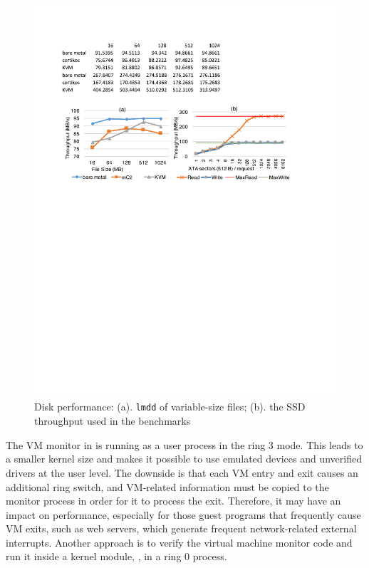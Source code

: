 \begin{figure}\centering
		\includegraphics[width=14cm]{figs/disk.pdf}
		\caption{Disk performance: (a). \texttt{lmdd} of variable-size files; (b). the SSD throughput used in the benchmarks}
		\label{fig:eval_disk}
		\hrulefill
\end{figure}


The VM monitor in \mCTOShyper{} is running as a user
process in the ring 3 mode. This leads to a smaller kernel
size and makes it possible to use emulated devices and unverified
drivers at the user level.  The downside is that each
VM entry and exit causes an additional ring switch, and VM-related
information must be copied to the monitor process in order for it to
process the exit. Therefore, it may have an impact on performance,
especially for those guest programs that frequently cause VM exits,
such as web servers, which generate frequent network-related external
interrupts.  Another approach is to verify the virtual machine monitor
code and run it inside a kernel module, \eg, in a ring 0 process.




